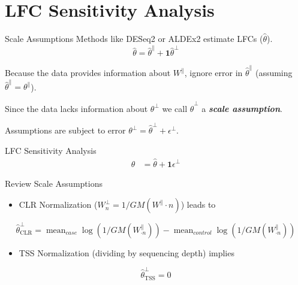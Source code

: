 \documentclass{beamer}
\DeclareMathOperator*{\mean}{mean}
\begin{document}
\section{LFC Sensitivity Analysis}
\label{sec:orgced24ba}
\begin{frame}[label={sec:org3f996c6}]{Scale Assumptions}
Methods like DESeq2 or ALDEx2 estimate LFCs (\(\hat{\theta}\)).
\[\hat{\theta}=\hat{\theta}^{\parallel} + \pmb{1}\hat{\theta}^{\perp}\]

\pause
\vfill
Because the data provides information about \(W^{\parallel}\), ignore error in \(\hat{\theta}^{\parallel}\)   (assuming \(\hat{\theta}^{\parallel}=\theta^{\parallel}\)).

\pause
\vfill
Since the data lacks information about \(\theta^{\perp}\) we call \(\hat{\theta}^{\perp}\) a \textit{\bf scale assumption}.

\pause
\vfill
Assumptions are subject to error \(\theta^{\perp}=\hat{\theta}^{\perp}+\epsilon^{\perp}\).

\pause
\vfill
\begin{block}{LFC Sensitivity Analysis}
\vspace{-2ex}
\begin{align*}
\theta &= \hat{\theta} + \mathbf{1}\epsilon^{\perp}
\end{align*}
\end{block}
\end{frame}
\begin{frame}[label={sec:orgd1abbf4}]{Review Scale Assumptions}
\vfill
\begin{itemize}
\item CLR Normalization (\(W^{\perp}_{n}=1/GM(W^{\parallel}\cdot n)\)) leads to
\end{itemize}
\[\hat{\theta}^{\perp}_{\text{CLR}} = \mean_{case}\log(1/GM(W^{\parallel}_{\cdot n}))-\mean_{control}\log (1/GM(W^{\parallel}_{\cdot n}))\]
\vfill
\begin{itemize}
\item TSS Normalization (dividing by sequencing depth) implies
\end{itemize}
\[\hat{\theta}^{\perp}_{\text{TSS}}=0\] 
\vfill
\end{frame}
\end{document}
